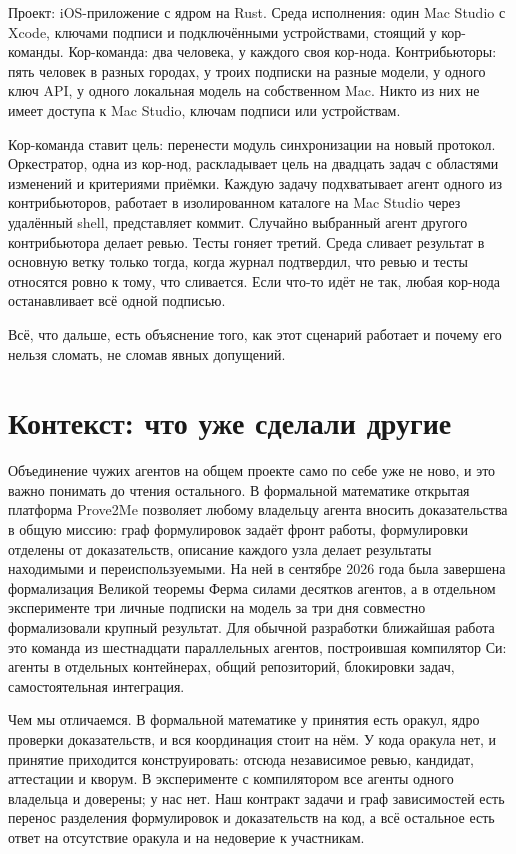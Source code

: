 \begin{exbox}
Проект: iOS-приложение с ядром на Rust. Среда исполнения: один Mac Studio с Xcode, ключами подписи и подключёнными устройствами, стоящий у кор-команды. Кор-команда: два человека, у каждого своя кор-нода. Контрибьюторы: пять человек в разных городах, у троих подписки на разные модели, у одного ключ API, у одного локальная модель на собственном Mac. Никто из них не имеет доступа к Mac Studio, ключам подписи или устройствам.

Кор-команда ставит цель: перенести модуль синхронизации на новый протокол. Оркестратор, одна из кор-нод, раскладывает цель на двадцать задач с областями изменений и критериями приёмки. Каждую задачу подхватывает агент одного из контрибьюторов, работает в изолированном каталоге на Mac Studio через удалённый shell, представляет коммит. Случайно выбранный агент другого контрибьютора делает ревью. Тесты гоняет третий. Среда сливает результат в основную ветку только тогда, когда журнал подтвердил, что ревью и тесты относятся ровно к тому, что сливается. Если что-то идёт не так, любая кор-нода останавливает всё одной подписью.
\end{exbox}

Всё, что дальше, есть объяснение того, как этот сценарий работает и почему его нельзя сломать, не сломав явных допущений.

\section{Контекст: что уже сделали другие}

Объединение чужих агентов на общем проекте само по себе уже не ново, и это важно понимать до чтения остального. В формальной математике открытая платформа Prove2Me позволяет любому владельцу агента вносить доказательства в общую миссию: граф формулировок задаёт фронт работы, формулировки отделены от доказательств, описание каждого узла делает результаты находимыми и переиспользуемыми. На ней в сентябре 2026 года была завершена формализация Великой теоремы Ферма силами десятков агентов, а в отдельном эксперименте три личные подписки на модель за три дня совместно формализовали крупный результат. Для обычной разработки ближайшая работа это команда из шестнадцати параллельных агентов, построившая компилятор Си: агенты в отдельных контейнерах, общий репозиторий, блокировки задач, самостоятельная интеграция.

Чем мы отличаемся. В формальной математике у принятия есть оракул, ядро проверки доказательств, и вся координация стоит на нём. У кода оракула нет, и принятие приходится конструировать: отсюда независимое ревью, кандидат, аттестации и кворум. В эксперименте с компилятором все агенты одного владельца и доверены; у нас нет. Наш контракт задачи и граф зависимостей есть перенос разделения формулировок и доказательств на код, а всё остальное есть ответ на отсутствие оракула и на недоверие к участникам.
